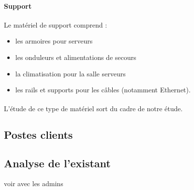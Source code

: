 \paragraph{Support}

\paragraph{} Le matériel de support comprend :

\begin{itemize}
  \item les armoires pour serveurs
  \item les onduleurs et alimentations de secours
  \item la climatisation pour la salle serveurs
  \item les rails et supports pour les câbles (notamment Ethernet).
\end{itemize}

\paragraph{} L'étude de ce type de matériel sort du cadre de notre étude.

\subsection{Postes clients}

\subsection{Analyse de l'existant}

voir avec les admins
